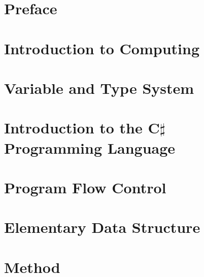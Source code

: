 \documentclass[11pt,titlepage]{book}
\begin{document}
\frontmatter

\tableofcontents
\chapter{Preface}
    
\mainmatter
\chapter{Introduction to Computing}
    
    
    
    
    
    
\chapter{Variable and Type System}
    
    
    
    
    
    
    
    
    
\chapter{Introduction to the C$\sharp$ Programming Language}
    
    
    
    
    
    
\chapter{Program Flow Control}
    
    
    
    
    
    
    
    
    
    
    
\chapter{Elementary Data Structure}
    
    
    
    
    
    
    
    
    
\chapter{Method}
    
    
\end{document}
